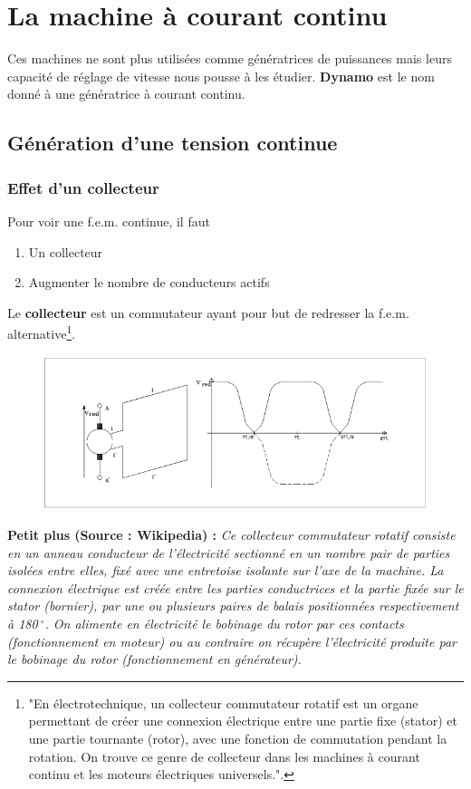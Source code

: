 \chapter{La machine à courant continu}
Ces machines ne sont plus utilisées comme génératrices de puissances 
mais leurs capacité de réglage de vitesse nous pousse à les étudier. 
\textbf{Dynamo} est le nom donné à une génératrice à courant continu.

\section{Génération d'une tension continue}
	\subsection{Effet d'un collecteur}
	Pour voir une f.e.m. continue, il faut 
	\begin{enumerate}
	\item Un collecteur
	\item Augmenter le nombre de conducteurs actifs
	\end{enumerate}
	Le \textbf{collecteur} est un commutateur ayant pour but de 
	redresser la f.e.m. alternative\footnote{"En électrotechnique, 
	un collecteur commutateur rotatif est un organe permettant de 
	créer 	une connexion électrique entre une partie fixe (stator) 
	et une 	partie tournante (rotor), avec une fonction de 
	commutation pendant la rotation. On trouve ce genre de 
	collecteur dans les machines à courant continu et les moteurs 
	électriques universels.".}.\\
	\begin{figure}
	\vspace{-5mm}
	\includegraphics[scale=0.34]{ch4/image1.png}
	\end{figure}
	\textbf{Petit plus (Source : Wikipedia) :} \textit{Ce collecteur 
	commutateur rotatif consiste en un anneau conducteur de l'électricité  
	sectionné en un nombre pair de parties 
	isolées entre elles, fixé avec une entretoise isolante sur l'axe de 
	la machine. La connexion électrique est créée entre les parties 
	conductrices et la partie fixée sur le stator (bornier), par une ou 
	plusieurs paires de balais positionnées respectivement à 180$\ ^\circ$. 
	On alimente en électricité le bobinage du rotor par ces contacts 
	(fonctionnement en moteur) ou au contraire on récupère l'électricité 
	produite par le bobinage du rotor (fonctionnement en générateur).}\ \\
	
